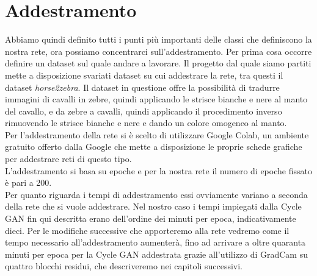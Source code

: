 \section{Addestramento}
Abbiamo quindi definito tutti i punti più importanti delle classi che definiscono la nostra rete, ora possiamo concentrarci sull'addestramento. Per prima cosa occorre definire un dataset sul quale andare a lavorare. Il progetto dal quale siamo partiti mette a disposizione svariati dataset su cui addestrare la rete, tra questi il dataset \emph{horse2zebra}. Il dataset in questione offre la possibilità di tradurre immagini di cavalli in zebre, quindi applicando le strisce bianche e nere al manto del cavallo, e da zebre a cavalli, quindi applicando il procedimento inverso rimuovendo le strisce bianche e nere e dando un colore omogeneo al manto.
\\Per l'addestramento della rete si è scelto di utilizzare Google Colab, un ambiente gratuito offerto dalla Google che mette a disposizione le proprie schede grafiche per addestrare reti di questo tipo. 
\\L'addestramento si basa su epoche e per la nostra rete il numero di epoche fissato è pari a 200.
\\Per quanto riguarda i tempi di addestramento essi ovviamente variano a seconda della rete che si vuole addestrare. Nel nostro caso i tempi impiegati dalla Cycle GAN fin qui descritta erano dell'ordine dei minuti per epoca, indicativamente dieci. Per le modifiche successive che apporteremo alla rete vedremo come il tempo necessario all'addestramento aumenterà, fino ad arrivare a oltre quaranta minuti per epoca per la Cycle GAN addestrata grazie all'utilizzo di GradCam su quattro blocchi residui, che descriveremo nei capitoli successivi.


